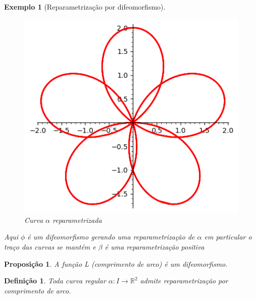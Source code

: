 \documentclass[12pt]{article}
\newtheorem{prop}{Proposição}
\newtheorem{ex}{Exemplo}[section]
\newtheorem{definition}{Definição}
\begin{document}
\begin{ex}[Reparametrização por difeomorfismo]
\begin{figure}[H]
    \centering
    \includegraphics[scale=.6]{Images/ex2.1-2.png}
    \caption{Curva $\alpha$ reparametrizada}
    \label{fig:ex2.1-2}
\end{figure}

Aqui $\phi$ é um difeomorfismo gerando uma reparametrização de $\alpha$ em particular o traço das curvas se mantém e $\beta$ é uma reparametrização positiva
\end{ex}

\begin{prop}
A função L (comprimento de arco) é um difeomorfismo.
\end{prop}

\begin{definition}
Toda curva regular $\alpha: I \rightarrow \mathbb{R}^2$ admite reparametrização por comprimento de arco.
\end{definition}
\end{document}
